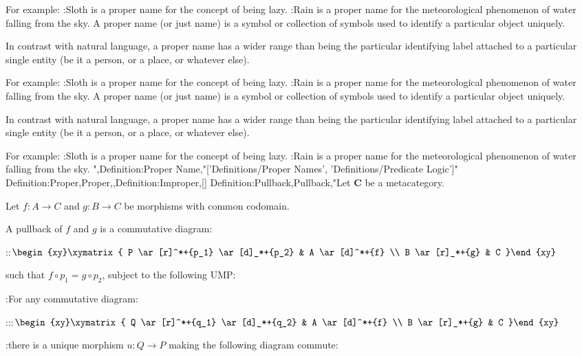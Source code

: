 For example:
:Sloth is a proper name for the concept of being lazy.
:Rain is a proper name for the meteorological phenomenon of water falling from the sky.
A proper name (or just name) is a symbol or collection of symbols used to identify a particular object uniquely.


In contrast with natural language, a proper name has a wider range than being the particular identifying label attached to a particular single entity (be it a person, or a place, or whatever else).

For example:
:Sloth is a proper name for the concept of being lazy.
:Rain is a proper name for the meteorological phenomenon of water falling from the sky.
A proper name (or just name) is a symbol or collection of symbols used to identify a particular object uniquely.


In contrast with natural language, a proper name has a wider range than being the particular identifying label attached to a particular single entity (be it a person, or a place, or whatever else).

For example:
:Sloth is a proper name for the concept of being lazy.
:Rain is a proper name for the meteorological phenomenon of water falling from the sky.
",Definition:Proper Name,"['Definitions/Proper Names', 'Definitions/Predicate Logic']"
Definition:Proper,Proper,,Definition:Improper,[]
Definition:Pullback,Pullback,"Let $\mathbf C$ be a metacategory.

Let $f: A \to C$ and $g: B \to C$ be morphisms with common codomain.


A pullback of $f$ and $g$ is a commutative diagram:

::$\begin{xy}\xymatrix{
 P
  \ar[r]^*+{p_1}
  \ar[d]_*+{p_2}
&
 A
  \ar[d]^*+{f}

\\
 B
  \ar[r]_*+{g}
&
 C
}\end{xy}$

such that $f \circ p_1 = g \circ p_2$, subject to the following UMP:


:For any commutative diagram:

:::$\begin{xy}\xymatrix{
 Q
  \ar[r]^*+{q_1}
  \ar[d]_*+{q_2}
&
 A
  \ar[d]^*+{f}

\\
 B
  \ar[r]_*+{g}
&
 C
}\end{xy}$

:there is a unique morphism $u: Q \to P$ making the following diagram commute:

